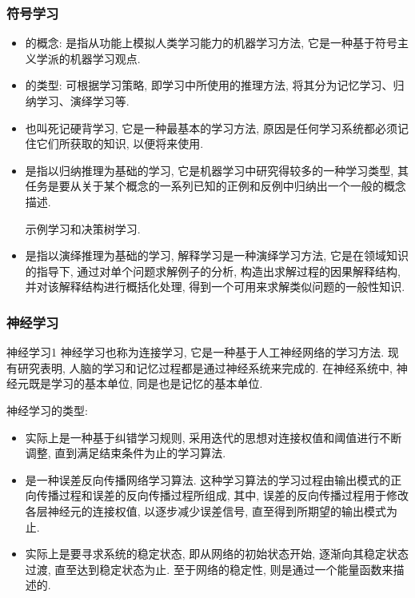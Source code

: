 \subsubsection{符号学习}
\begin{itemize}
\item {}的概念: 是指从功能上模拟人类学习能力的机器学习方法, 它是一种基于符号主义学派的机器学习观点.
\item {}的类型: 可根据学习策略, 即学习中所使用的推理方法, 将其分为记忆学习、归纳学习、演绎学习等.
\item {}也叫死记硬背学习, 它是一种最基本的学习方法, 原因是任何学习系统都必须记住它们所获取的知识, 以便将来使用.
\item {}是指以归纳推理为基础的学习, 它是机器学习中研究得较多的一种学习类型, 其任务是要从关于某个概念的一系列已知的正例和反例中归纳出一个一般的概念描述.
\begin{example}
  示例学习和决策树学习.
\end{example}
\item {}是指以演绎推理为基础的学习, 解释学习是一种演绎学习方法, 它是在领域知识的指导下, 通过对单个问题求解例子的分析, 构造出求解过程的因果解释结构, 并对该解释结构进行概括化处理, 得到一个可用来求解类似问题的一般性知识.
\end{itemize}
\subsubsection{神经学习}
\begin{mydef}{神经学习}{1}
神经学习也称为连接学习, 它是一种基于人工神经网络的学习方法. 现有研究表明, 人脑的学习和记忆过程都是通过神经系统来完成的. 在神经系统中, 神经元既是学习的基本单位, 同是也是记忆的基本单位.
\end{mydef}

神经学习的类型:
\begin{itemize}
\item {}实际上是一种基于纠错学习规则, 采用迭代的思想对连接权值和阈值进行不断调整, 直到满足结束条件为止的学习算法.
\item {}是一种误差反向传播网络学习算法. 这种学习算法的学习过程由输出模式的正向传播过程和误差的反向传播过程所组成, 其中, 误差的反向传播过程用于修改各层神经元的连接权值, 以逐步减少误差信号, 直至得到所期望的输出模式为止.
\item {}实际上是要寻求系统的稳定状态, 即从网络的初始状态开始, 逐渐向其稳定状态过渡, 直至达到稳定状态为止. 至于网络的稳定性, 则是通过一个能量函数来描述的.
\end{itemize}
